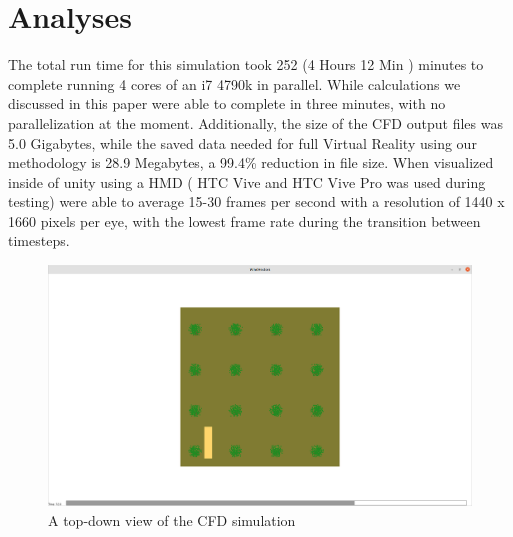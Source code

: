 \section{Analyses}
The total run time for this simulation took 252 (4 Hours 12 Min ) minutes to complete running 4 cores of an i7 4790k in parallel. While calculations we discussed in this paper were able to complete in three minutes, with no parallelization at the moment. Additionally, the size of the CFD output files was 5.0 Gigabytes, while the saved data needed for full Virtual Reality using our methodology is 28.9 Megabytes, a 99.4\% reduction in file size. When visualized inside of unity using a HMD ( HTC Vive and HTC Vive Pro was used during testing) were able to average 15-30 frames per second with a resolution of 1440 x 1660 pixels per eye, with the lowest frame rate during the transition between timesteps.
\begin{figure}
\centering
\includegraphics[scale=.1]{Figures/fdsPartTopView.png}
\decoRule
\caption[CFD Simulation]{A top-down view of the CFD simulation}
\label{fig:CFDTopDown}
\end{figure}
